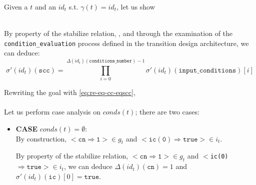 \documentclass[dvipsnames,12pt]{article}
\begin{document}
\begin{niproof}
  Given a $t$ and an $id_t$ s.t. $\gamma(t)=id_t$, let us show\\
  \\

  \exT

  \noindent By property of the \hvhdl{} stabilize relation,
  \InCsCompT{}, and through the examination of the
  \texttt{condition_evaluation} process defined in the transition
  design architecture, we can deduce:
  \begin{equation}
    \sigma'(id_t)(\texttt{scc})=\prod\limits_{i=0}^{\Delta(id_t)(\texttt{conditions\_number})-1}\sigma'(id_t)(\texttt{input\_conditions})[i]\label{eq:re-eq-cc-eqscc}
  \end{equation}

  \noindent{}Rewriting the goal with \ref{eq:re-eq-cc-eqscc},\\
  \\

  \noindent{}Let us perform case analysis on $conds(t)$; there are two cases:

  \begin{itemize}
  \item \textbf{CASE} $conds(t)=\emptyset$:
    \\
    
    By construction, ${<}\mathtt{cn\Rightarrow{}1}{>}\in{}g_t$ and
    ${<}\mathtt{ic(0)\Rightarrow{}true}{>}\in{}i_t$.

    By property of the stabilize relation,
    ${<}\mathtt{cn\Rightarrow{}1}{>}\in{}g_t$ and
    ${<}$\texttt{ic(0)}$\mathtt{\Rightarrow{}true}{>}\in{}i_t$, we can
    deduce $\Delta(id_t)(\texttt{cn})=1$ and
    $\sigma'(id_t)(\texttt{ic})[0]=\mathtt{true}$.


\end{itemize}
\end{niproof}
\end{document}
